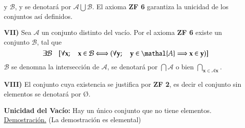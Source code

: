 \begin{iteritem}
y $\mathcal{B}$, y se denotará por $\mathcal{A} \bigcup \mathcal{B}$. El axioma \textbf{ZF 6} garantiza la unicidad de los conjuntos así definidos.
\item \textbf{VII)} Sea $\mathcal{A}$ un conjunto distinto del vacío. Por el axioma \textbf{ZF 6} existe un conjunto $\mathcal{B}$, tal
que
\[
\exists \mathcal{B} \quad [ \forall \mathbf{x}; \quad \mathbf{x} \in \mathcal{B} \Longleftrightarrow (\forall \mathbf{y}; \quad \mathbf{y} \in \mathal{A} \Longrightarrow \mathbf{x} \in \mathbf{y})]
\]
$\mathcal{B}$ se denomna la intersección de $\mathcal{A}$, se denotará por $\bigcap \mathcal{A}$ o bien $\bigcap_{\mathbf{x} \in \mathcal{A} \mathbf{x}}$.
\item \textbf{VIII)} El conjunto cuya existencia se justifica por \textbf{ZF 2}, es decir el conjunto sin elementos se denotará por \O.
\end{iteritem}

\begin{proposition} 
\textbf{Unicidad del Vacío:} Hay un único conjunto que no tiene elementos.\\
\underline{Demostración.} (La demostración es elemental)
\end{proposition}

